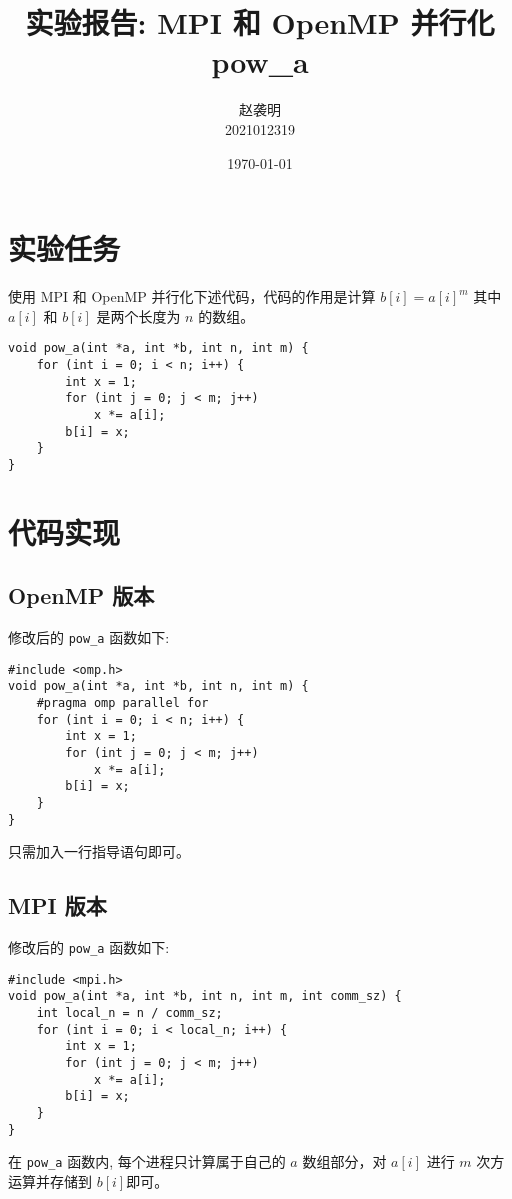 \documentclass[a4paper, 12pt]{article}
\title{实验报告: MPI 和 OpenMP 并行化 pow\_a}
\author{赵袭明 \\ 2021012319}
\date{\today}
\begin{document}
\maketitle

\section{实验任务}
使用 MPI 和 OpenMP 并行化下述代码，代码的作用是计算 $b[i] = a[i]^m$ 其中 $a[i]$ 和 $b[i]$ 是两个长度为 $n$ 的数组。
\begin{lstlisting}
void pow_a(int *a, int *b, int n, int m) {
    for (int i = 0; i < n; i++) {
        int x = 1;
        for (int j = 0; j < m; j++)
            x *= a[i];
        b[i] = x;
    }
}
\end{lstlisting}

\section{代码实现}

\subsection{OpenMP 版本}
修改后的 \texttt{pow\_a} 函数如下:

\begin{lstlisting}
#include <omp.h>
void pow_a(int *a, int *b, int n, int m) {
    #pragma omp parallel for
    for (int i = 0; i < n; i++) {
        int x = 1;
        for (int j = 0; j < m; j++)
            x *= a[i];
        b[i] = x;
    }
}
\end{lstlisting}

只需加入一行指导语句即可。

\subsection{MPI 版本}
修改后的 \texttt{pow\_a} 函数如下:
\begin{lstlisting}
#include <mpi.h>
void pow_a(int *a, int *b, int n, int m, int comm_sz) {
    int local_n = n / comm_sz;
    for (int i = 0; i < local_n; i++) {
        int x = 1;
        for (int j = 0; j < m; j++)
            x *= a[i];
        b[i] = x;
    }
}
\end{lstlisting}

在 \texttt{pow\_a} 函数内, 每个进程只计算属于自己的 $a$ 数组部分，对 $a[i]$ 进行 $m$ 次方运算并存储到 $b[i]$即可。
\end{document}

